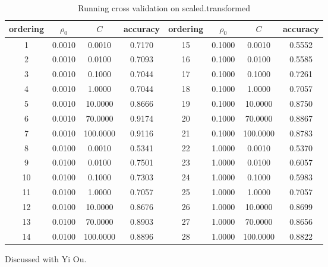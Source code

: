 \documentclass[12pt, fullpage,letterpaper]{article}
\begin{document}
\begin{enumerate}
\begin{table}[h] 
    \centering
    \begin{tabular}{|c|c|c|c|c|c|c|c|}
    \hline
  ordering  &$\rho_0$& $C$ & accuracy & ordering &  $\rho_0$& $C$ & accuracy \\
    \hline
  1 & 0.0010 & 0.0010 & 0.7170 & 15 & 0.1000 & 0.0010 & 0.5552 \\
  2 & 0.0010 & 0.0100 & 0.7093 & 16 & 0.1000 & 0.0100 & 0.5585 \\
  3 & 0.0010 & 0.1000 & 0.7044 & 17 & 0.1000 & 0.1000 & 0.7261 \\
  4 & 0.0010 & 1.0000 & 0.7044 & 18 & 0.1000 & 1.0000 & 0.7057 \\
  5 & 0.0010 & 10.0000 & 0.8666 & 19 & 0.1000 & 10.0000 & 0.8750 \\
  6 & 0.0010 & 70.0000 & 0.9174 & 20 & 0.1000 & 70.0000 & 0.8867 \\
  7 & 0.0010 & 100.0000 & 0.9116 & 21 & 0.1000 & 100.0000 & 0.8783 \\
  8 & 0.0100 & 0.0010 & 0.5341 & 22 & 1.0000 & 0.0010 & 0.5370 \\
  9 & 0.0100 & 0.0100 & 0.7501 & 23 & 1.0000 & 0.0100 & 0.6057 \\
  10 & 0.0100 & 0.1000 & 0.7303 & 24 & 1.0000 & 0.1000 & 0.5983 \\
  11 & 0.0100 & 1.0000 & 0.7057 & 25 & 1.0000 & 1.0000 & 0.7057 \\
  12 & 0.0100 & 10.0000 & 0.8676 & 26 & 1.0000 & 10.0000 & 0.8699 \\
  13 & 0.0100 & 70.0000 & 0.8903 & 27 & 1.0000 & 70.0000 & 0.8656 \\
  14 & 0.0100 & 100.0000 & 0.8896 & 28 & 1.0000 & 100.0000 & 0.8822 \\
      \hline
    \end{tabular}
    \caption{Running cross validation on scaled.transformed}\label{t:7}
  \end{table}
  
 Discussed with Yi Ou.

 \end{enumerate}
\end{document}
